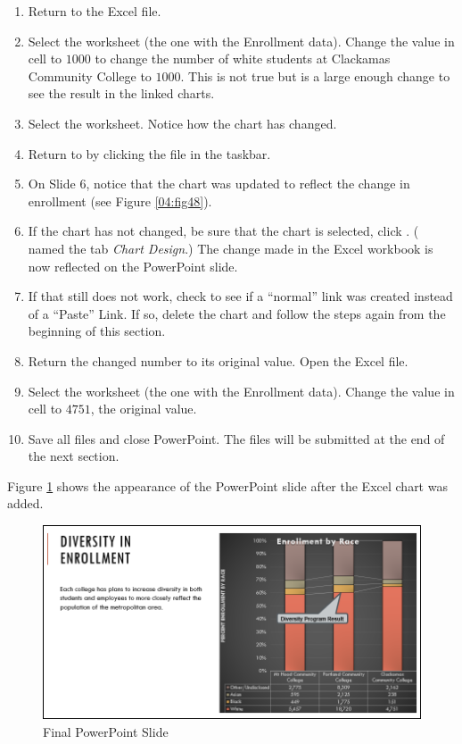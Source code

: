 \begin{enumbox}
	\begin{enumerate}
		\item Return to the  Excel file.
		\item Select the  worksheet (the one with the Enrollment data). Change the value in cell  to $ 1000 $ to change the number of white students at Clackamas Community College to $ 1000 $. This is not true but is a large enough change to see the result in the linked charts.
		\item Select the  worksheet. Notice how the chart has changed.
		\item Return to  by clicking the file in the taskbar.
		\item On Slide $ 6 $, notice that the chart was updated to reflect the change in enrollment (see Figure \ref{04:fig48}).
		\item If the chart has not changed, be sure that the chart is selected, click . ( named the tab \textit{Chart Design}.) The change made in the Excel workbook is now reflected on the PowerPoint slide.
		\item If that still does not work, check to see if a ``normal'' link was created instead of a ``Paste'' Link. If so, delete the chart and follow the steps again from the beginning of this section.
		\item Return the changed number to its original value. Open the   Excel file.
		\item Select the  worksheet (the one with the Enrollment data). Change the value in cell  to $ 4751 $, the original value.
		\item Save all files and close PowerPoint. The files will be submitted at the end of the next section.
	\end{enumerate}
\end{enumbox}

Figure \ref{04:fig51} shows the appearance of the PowerPoint slide after the Excel chart was added. 

\begin{figure}[H]
	\centering
	\includegraphics[width=\maxwidth{.95\linewidth}]{gfx/ch04_fig51}
	\caption{Final PowerPoint Slide}
	\label{04:fig51}
\end{figure}

